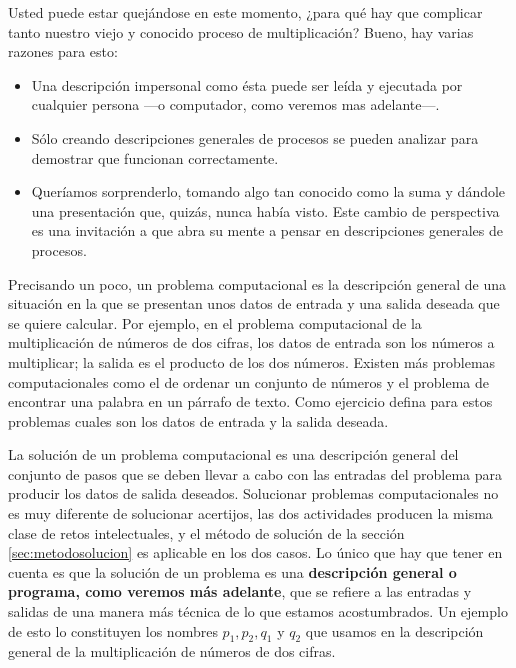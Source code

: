Usted puede estar quejándose en este momento, ¿para qué hay que complicar tanto
nuestro viejo y conocido proceso de multiplicación? Bueno, hay varias razones
para  esto:

\begin{itemize}
	\item Una descripción impersonal como ésta puede ser leída y ejecutada por 
	cualquier persona ---o computador, como veremos mas adelante---.
	
	\item Sólo creando descripciones generales de procesos se pueden analizar 
	para demostrar que funcionan correctamente.
	
	\item Queríamos sorprenderlo, tomando algo tan conocido como la suma y 
	dándole
	una presentación que, quizás, nunca había visto. Este cambio de perspectiva
	es una invitación a que abra su mente a pensar en descripciones generales 
	de procesos.
\end{itemize}

Precisando un poco, un problema computacional es la descripción general de una
situación en la que se presentan unos datos de entrada y una salida deseada
que se quiere calcular. Por ejemplo, en el problema computacional de la 
multiplicación de números de dos cifras, los datos de entrada son los números 
a multiplicar; la salida es el producto de los dos números. Existen más 
problemas computacionales como el de ordenar un conjunto de números y el 
problema de encontrar una palabra en un párrafo de texto. Como ejercicio 
defina para estos problemas cuales son los datos de entrada 
y la salida deseada.

La solución de un problema computacional es una descripción general del  
conjunto de pasos que se deben llevar a cabo con las entradas del problema para 
producir los datos de salida deseados.  Solucionar problemas computacionales no 
es muy diferente de solucionar acertijos, las dos actividades producen la misma 
clase de retos intelectuales, y el método de solución de la sección 
\ref{sec:metodosolucion} es aplicable en los dos casos.
Lo único que hay que tener en cuenta es que la solución de un problema es una 
{\bf descripción general o programa, como veremos más adelante}, que se refiere 
a las entradas y salidas de una manera más técnica de lo que estamos 
acostumbrados. Un ejemplo de esto lo constituyen los nombres $p_1,p_2,q_1$ y 
$q_2$ que usamos en la descripción general de la multiplicación de números de 
dos cifras. 

